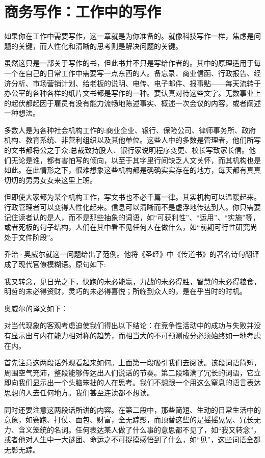 \chapter{商务写作：工作中的写作}
如果你在工作中需要写作，这一章就是为你准备的。就像科技写作一样，焦虑是问题的关键，而人性化和清晰的思考则是解决问题的关键。

虽然这只是一部关于写作的书，但此书并不只是写给作者的。其中的原理适用于每一个在自己的日常工作中需要写一点东西的人。备忘录、商业信函、行政报告、经济分析、市场营销计划、给老板的说明、电传、电子邮件、报事贴——每天流转于办公室的各种各样的纸片文书都是写作的一种。要认真对待这些文字。无数事业上的起伏都起因于雇员有没有能力流畅地陈述事实、概述一次会议的内容，或者阐述一种想法。

多数人是为各种社会机构工作的:商业企业、银行、保险公司、律师事务所、政府机构、教育系统、非营利组织以及其他单位。这些人中的多数是管理者，他们所写的文书都将公之于众:总裁致持股人、银行家说明程序变更、校长写致家长信。他们无论是谁，都有害怕写的倾向，以至于其字里行间缺乏人文关怀，而其机构也是如此。在此情形之下，很难想象这些机构都是确确实实存在的地方，每天都有真真切切的男男女女来这里上班。

但即使大家都为某个机构工作，写文书也不必千篇一律。其实机构可以温暖起来。行政管理者可以变得人性化起来。信息可以清晰而不是虚浮地传达到人。你只需要记住读者认的是人，而不是那些抽象的词语，如“可获利性”、“运用”、“实施”等，或者死板的句子结构，人们在其中看不见任何人在做什么，如“前期可行性研究尚处于文件阶段”。

乔治·奥威尔就这一问题给出了范例。他将《圣经》中《传道书》的著名诗句翻译成了现代官僚模糊语。原句如下:

我又转念，见日光之下，快跑的未必能赢，力战的未必得胜，智慧的未必得粮食，明哲的未必得资财，灵巧的未必得喜悦；所临到众人的，是在乎当时的时机。

奥威尔的译文如下：

对当代现象的客观考虑迫使我们得出以下结论：在竞争性活动中的成功与失败并没有显示出与内在能力相对称的趋势，而相当大的不可预测成分必须始终如一地考虑在内。

首先注意这两段话外观看起来如何。上面第一段吸引我们去阅读。该段词语简短，周围空气充沛，整段能够传达出人们说话的节奏。第二段堵满了冗长的词语，它立即向我们显示出一个头脑笨拙的人在思考。我们不想跟一个用这么窒息的语言表达思想的人去任何地方。我们甚至连读都不想读。

同时还要注意这两段话所讲的内容。在第二段中，那些简短、生动的日常生活中的意象，如赛跑、打仗、面包、财富，全无踪影，而顶替这些的是摇摇晃晃、冗长无力、含义笼统的名词。任何表达某人做了什么事的意思都不见了，如“我又转念”，或者他对人生中一大谜团、命运之不可捉摸感悟到了什么，如“见”，这些词语全都无影无踪。

